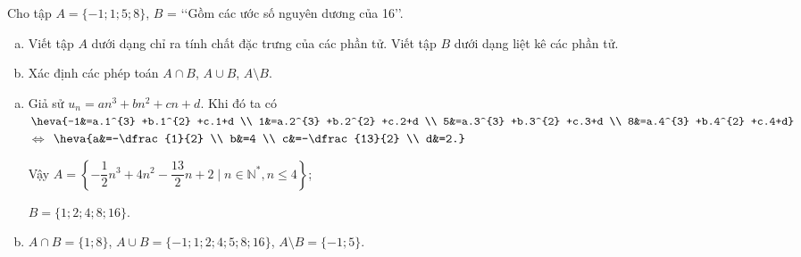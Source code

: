 \begin{bt}%
	Cho tập $A=\{-1;1;5;8\}$, $B$ = \lq\lq Gồm các ước số nguyên dương của 16\rq\rq.
	\begin{enumerate}  [a)]
		\item Viết tập $A$ dưới dạng chỉ ra tính chất đặc trưng của các phần tử. Viết tập $B$ dưới dạng liệt kê các phần tử.
		\item Xác định các phép toán $A \cap B$, $A \cup B$, $A \setminus B$.
	\end{enumerate}
	\loigiai
	{  \begin{enumerate}[a)]
			\item Giả sử $u_{n}=an^{3} +bn^{2} +cn+d.$ Khi đó ta có 
			$\heva{-1&=a.1^{3} +b.1^{2} +c.1+d \\ 1&=a.2^{3} +b.2^{2} +c.2+d \\ 5&=a.3^{3} +b.3^{2} +c.3+d \\ 8&=a.4^{3} +b.4^{2} +c.4+d}$ $\Leftrightarrow$ $\heva{a&=-\dfrac{1}{2} \\ b&=4 \\ c&=-\dfrac{13}{2} \\ d&=2.}$
			
			Vậy $A=\left \{- \dfrac{1}{2}n^{3} +4n^{2} - \dfrac{13}{2}n+2 \mid n \in \mathbb{N^*}, n \le 4 \right \}$;
			
			$B=\{1;2;4;8;16\}$.
			\item $A \cap B = \{1;8 \}$, $A \cup B =\{-1;1;2;4;5;8;16\}$, $A \setminus B = \{-1;5\}.$
		\end{enumerate}
	}
\end{bt}

